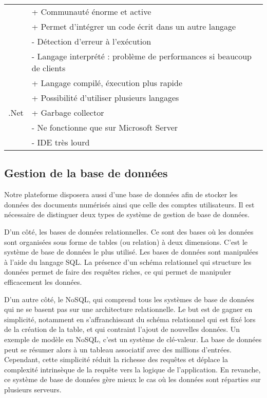 \begin{tabular}{|l|l|}
                & + Communauté énorme et active \\
                & + Permet d’intégrer un code écrit dans un autre langage \\
                & - Détection d’erreur à l’exécution \\
                & - Langage interprété : problème de performances si beaucoup de clients \\ \hline
            \multirow{6}{*}{.Net} & + Langage compilé, éxecution plus rapide \\
                & + Possibilité d'utiliser plusieurs langages \\
                & + Garbage collector \\
                & - Ne fonctionne que sur Microsoft Server \\
                & - IDE très lourd \\ 
            \hline
        \end{tabular}

    \subsection{Gestion de la base de données}
    \label{subsec:bdd}

   Notre plateforme disposera aussi d’une base de données afin de stocker les données des documents numérisés ainsi que celle des comptes utilisateurs. Il est nécessaire de distinguer deux types de système de gestion de base de données.

    D’un côté, les bases de données relationnelles. Ce sont des bases où les données sont organisées sous forme de tables (ou relation) à deux dimensions. C’est le système de base de données le plus utilisé. Les bases de données sont manipulées à l’aide du langage SQL. La présence d’un schéma relationnel qui structure les données permet de faire des requêtes riches, ce qui permet de manipuler efficacement les données.

    D’un autre côté, le NoSQL, qui comprend tous les systèmes de base de données qui ne se basent pas sur une architecture relationnelle. Le but est de gagner en simplicité, notamment en s’affranchissant du schéma relationnel qui est fixé lors de la création de la table, et qui contraint l’ajout de nouvelles données. Un exemple de modèle en NoSQL, c’est un système de clé-valeur. La base de données peut se résumer alors à un tableau associatif avec des millions d’entrées. Cependant, cette simplicité réduit la richesse des requêtes et déplace la complexité intrinsèque de la requête vers la logique de l’application. En revanche, ce système de base de données gère mieux le cas où les données sont réparties sur plusieurs serveurs.


